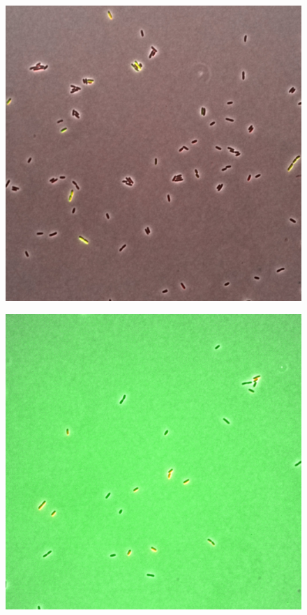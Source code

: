 \documentclass[11pt]{book}
\begin{document}
\begin{figure}[h]
\centering
	\begin{minipage}{.5\textwidth}
  		\centering
  		\includegraphics[width=.9\linewidth]{greenstate008Composite.jpg}
  		\label{fig:onc1GreenStateComposite}
	\end{minipage}%
	\begin{minipage}{.5\textwidth}
  		\centering
  		\includegraphics[width=.9\linewidth]{redstate014Composite.jpg}
  		\label{fig:onc1RedStateComposite}  
	\end{minipage}
\end{figure}
\end{document}
